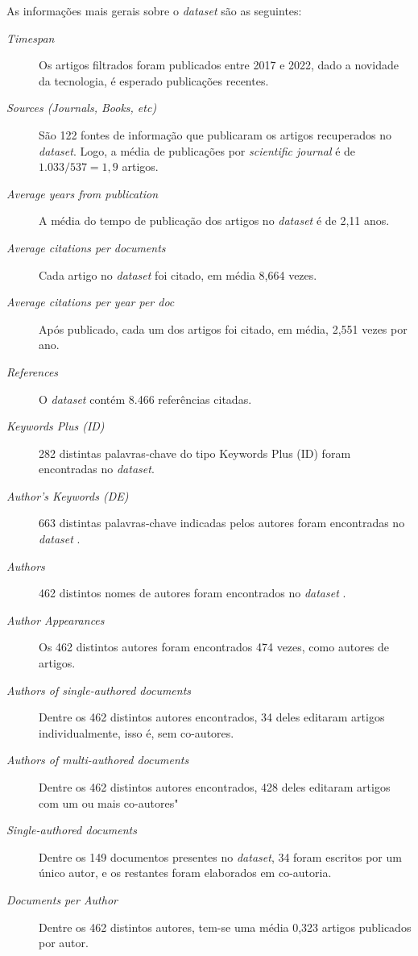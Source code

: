 As informações mais gerais sobre o \textit{dataset} são as seguintes:
\begin{description}
    \item [\textit{Timespan}] Os artigos filtrados foram publicados entre 2017 e 2022, dado a novidade da tecnologia, é esperado publicações recentes.
    \item [\textit{Sources (Journals, Books, etc)}] São 122 fontes de informação que publicaram os artigos recuperados no \textit{dataset}. Logo, a média de publicações por \textit{scientific journal} é de $1.033/537=1,9$ artigos.
    \item [\textit{Average years from publication}] A média do tempo de publicação dos artigos no \textit{dataset} é de 2,11 anos.
    \item [\textit{Average citations per documents}] Cada artigo no \textit{dataset} foi citado, em média 8,664 vezes.
    \item [\textit{Average citations per year per doc}] Após publicado, cada um dos artigos foi citado, em média, 2,551 vezes por ano.
    \item [\textit{References}] O \textit{dataset} contém 8.466 referências citadas.
    \item [\textit{Keywords Plus (ID)}] 282 distintas palavras-chave do tipo Keywords Plus (ID) foram encontradas no \textit{dataset}.
    \item [\textit{Author's Keywords (DE)}] 663 distintas palavras-chave indicadas pelos autores foram encontradas no \textit{dataset} .
    \item [\textit{Authors}] 462 distintos nomes de autores foram encontrados no \textit{dataset} .
    \item [\textit{Author Appearances}] Os 462 distintos autores foram encontrados 474 vezes, como autores de artigos.
    \item [\textit{Authors of single-authored documents}] Dentre os 462 distintos autores encontrados, 34 deles editaram artigos individualmente, isso é, sem co-autores.
    \item [\textit{Authors of multi-authored documents}] Dentre os 462 distintos autores encontrados, 428 deles editaram artigos com um ou mais co-autores"
    \item [\textit{Single-authored documents}] Dentre os 149 documentos presentes no \textit{dataset}, 34 foram escritos por um único autor, e os restantes foram elaborados em co-autoria.
    \item [\textit{Documents per Author}] Dentre os 462 distintos autores, tem-se uma média 0,323 artigos publicados por autor.

\end{description}
